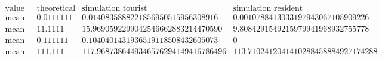 \[\begin{array}{cccc}
 \text{value} & \text{theoretical} & \text{simulation tourist} & \text{simulation resident} \\
 \text{mean queue size} & 0.0111111 & 0.0140835888221856950515956308916 & 0.0010788413033197943067105909226 \\
 \text{mean queue time} & 11.1111 & 15.9690592299042546662883214470590 & 9.8084291549215979941968932755778 \\
 \text{mean system size} & 0.111111 & 0.1040401431936519118508432605073 & 0 \\
 \text{mean system time} & 111.111 & 117.9687386449346576294149416786496 & 113.7102412041410288458884927174288 \\
\end{array}\]

